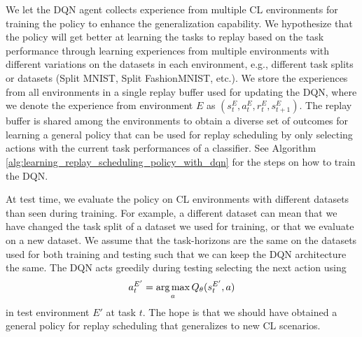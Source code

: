 We let the DQN agent collects experience from multiple CL environments for training the policy to enhance the generalization capability. We hypothesize that the policy will get better at learning the tasks to replay based on the task performance through learning experiences from multiple environments with different variations on the datasets in each environment, e.g., different task splits or datasets (Split MNIST, Split FashionMNIST, etc.). 
We store the experiences from all environments in a single replay buffer used for updating the DQN, where we denote the experience from environment $E$ as $(s_{t}^{E}, a_{t}^{E}, r_{t}^{E}, s_{t+1}^{E})$. The replay buffer is shared among the environments to obtain a diverse set of outcomes for learning a general policy that can be used for replay scheduling by only selecting actions with the current task performances of a classifier. See Algorithm \ref{alg:learning_replay_scheduling_policy_with_dqn} for the steps on how to train the DQN. 

At test time, we evaluate the policy on CL environments with different datasets than seen during training. For example, a different dataset can mean that we have changed the task split of a dataset we used for training, or that we evaluate on a new dataset. We assume that the task-horizons are the same on the datasets used for both training and testing such that we can keep the DQN architecture the same. The DQN acts greedily during testing selecting the next action using
\begin{align}
    a_{t}^{E'} = \operatorname*{arg\,max}_{a} Q_{\theta}(s_{t}^{E'}, a) 
\end{align}
in test environment $E'$ at task $t$. The hope is that we should have obtained a general policy for replay scheduling that generalizes to new CL scenarios.  



